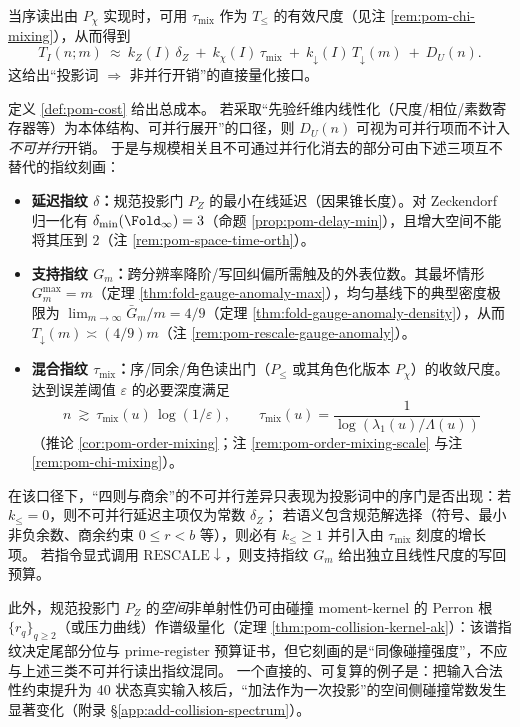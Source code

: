 \begin{remark}[角色投影门下的时间上界]\label{rem:pom-cost-chi}
当序读出由 $P_\chi$ 实现时，可用 $\tau_{\mathrm{mix}}$ 作为 $T_{\le}$ 的有效尺度（见注 \ref{rem:pom-chi-mixing}），从而得到
\[
T_I(n;m)\ \approx\ k_Z(I)\,\delta_Z\ +\ k_\chi(I)\,\tau_{\mathrm{mix}}\ +\ k_{\downarrow}(I)\,T_{\downarrow}(m)\ +\ D_U(n).
\]
这给出“投影词 $\Rightarrow$ 非并行开销”的直接量化接口。
\end{remark}

\begin{remark}[不可并行开销的三正交指纹（延迟/支持/混合）]\label{rem:pom-nonparallel-three-meters}
定义 \ref{def:pom-cost} 给出总成本。
若采取“先验纤维内线性化（尺度/相位/素数寄存器等）为本体结构、可并行展开”的口径，则 $D_U(n)$ 可视为可并行项而不计入\emph{不可并行}开销。
于是与规模相关且不可通过并行化消去的部分可由下述三项互不替代的指纹刻画：
\begin{itemize}
  \item \textbf{延迟指纹 \(\delta\)：}规范投影门 \(P_Z\) 的最小在线延迟（因果锥长度）。对 Zeckendorf 归一化有
  \(\delta_{\min}(\Fold_\infty)=3\)（命题 \ref{prop:pom-delay-min}），且增大空间不能将其压到 \(2\)（注 \ref{rem:pom-space-time-orth}）。
  \item \textbf{支持指纹 \(G_m\)：}跨分辨率降阶/写回纠偏所需触及的外表位数。其最坏情形 \(G_m^{\max}=m\)（定理 \ref{thm:fold-gauge-anomaly-max}），均匀基线下的典型密度极限为
  \(\lim_{m\to\infty}\bar G_m/m=4/9\)（定理 \ref{thm:fold-gauge-anomaly-density}），从而 \(T_{\downarrow}(m)\asymp (4/9)m\)（注 \ref{rem:pom-rescale-gauge-anomaly}）。
  \item \textbf{混合指纹 \(\tau_{\mathrm{mix}}\)：}序/同余/角色读出门（\(P_{\le}\) 或其角色化版本 \(P_\chi\)）的收敛尺度。达到误差阈值 \(\varepsilon\) 的必要深度满足
  \[
  n\ \gtrsim\ \tau_{\mathrm{mix}}(u)\,\log(1/\varepsilon),
  \qquad
  \tau_{\mathrm{mix}}(u)=\frac{1}{\log(\lambda_1(u)/\Lambda(u))}
  \]
  （推论 \ref{cor:pom-order-mixing}；注 \ref{rem:pom-order-mixing-scale} 与注 \ref{rem:pom-chi-mixing}）。
\end{itemize}
在该口径下，“四则与商余”的不可并行差异只表现为投影词中的序门是否出现：若 \(k_{\le}=0\)，则不可并行延迟主项仅为常数 \(\delta_Z\)；
若语义包含规范解选择（符号、最小非负余数、商余约束 \(0\le r<b\) 等），则必有 \(k_{\le}\ge 1\) 并引入由 \(\tau_{\mathrm{mix}}\) 刻度的增长项。
若指令显式调用 \(\mathrm{RESCALE}\downarrow\)，则支持指纹 \(G_m\) 给出独立且线性尺度的写回预算。
\par
此外，规范投影门 \(P_Z\) 的\emph{空间}非单射性仍可由碰撞 moment-kernel 的 Perron 根 \(\{r_q\}_{q\ge 2}\)（或压力曲线）作谱级量化（定理 \ref{thm:pom-collision-kernel-ak}）：该谱指纹决定尾部分位与 prime-register 预算证书，但它刻画的是“同像碰撞强度”，不应与上述三类不可并行读出指纹混同。
一个直接的、可复算的例子是：把输入合法性约束提升为 40 状态真实输入核后，“加法作为一次投影”的空间侧碰撞常数发生显著变化（附录 \S\ref{app:add-collision-spectrum}）。
\end{remark}

